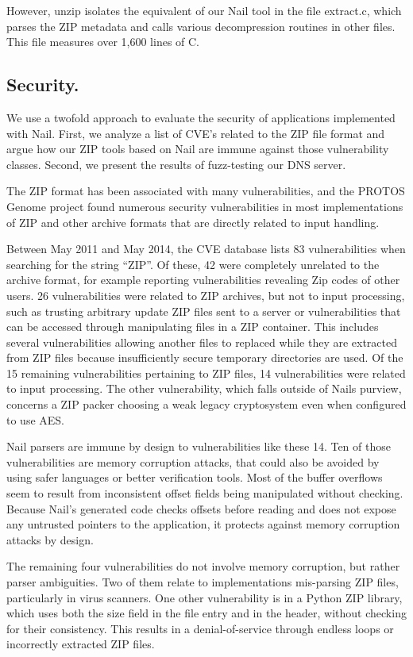 However, unzip isolates the equivalent of our Nail tool in the file extract.c, which parses the ZIP
metadata and calls various decompression routines in other files. This file measures over 1,600
lines of C. 

\subsection{Security.} 
We use a twofold approach to evaluate the security of applications implemented with Nail. First, we
analyze a list of CVE's related to the ZIP file format and argue how our ZIP tools based on Nail are
immune against those vulnerability classes. Second, we present the results of fuzz-testing our DNS
server.

The ZIP format has been associated with many vulnerabilities, and the PROTOS Genome project found numerous
security vulnerabilities in most implementations of ZIP and other archive formats that are directly
related to input handling.

Between May 2011 and May 2014, the CVE database\cite{cve-database} lists 83 vulnerabilities when searching for the
string ``ZIP''. Of these, 42 were completely unrelated to the archive format, for example reporting
vulnerabilities revealing Zip codes of other users. 26 vulnerabilities were related to ZIP archives,
but not to input processing, such as trusting arbitrary update ZIP files sent to a server or
vulnerabilities that can be accessed through manipulating files in a ZIP container. This includes
several vulnerabilities allowing another files to replaced while they are extracted from ZIP
files because insufficiently secure temporary directories are used. Of the 15 remaining
vulnerabilities pertaining to ZIP files, 14 vulnerabilities were related to input processing. The
 other vulnerability, which falls outside of Nails purview, concerns a ZIP packer choosing a weak
 legacy cryptosystem even when configured to use AES.

 Nail parsers are immune by design to vulnerabilities like these 14. Ten of those vulnerabilities
 are memory corruption attacks, that could also be avoided by using safer languages or better
 verification tools. Most of the buffer overflows seem to result from inconsistent offset fields
 being manipulated without checking. Because Nail's generated code checks offsets before reading and
 does not expose any untrusted pointers to the application, it protects against memory corruption
 attacks by design.

The remaining four vulnerabilities do not involve memory corruption, but rather parser ambiguities.
Two of them relate to implementations mis-parsing ZIP files, particularly in virus scanners. One
other vulnerability is in a Python ZIP library, which uses both the size field in the file entry and
in the header, without checking for their consistency. This results in a denial-of-service through
endless loops or incorrectly extracted ZIP files.

